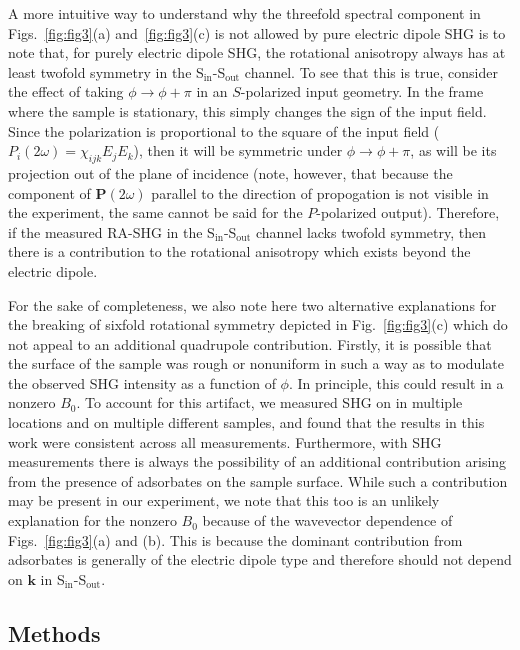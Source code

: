 A more intuitive way to understand why the threefold spectral component in Figs.~\ref{fig:fig3}(a) and~\ref{fig:fig3}(c) is not allowed by pure electric dipole SHG is to note that, for purely electric dipole SHG, the rotational anisotropy always has at least twofold symmetry in the S$_\mathrm{in}$-S$_\mathrm{out}$ channel.
To see that this is true, consider the effect of taking $\phi\rightarrow\phi+\pi$ in an $S$-polarized input geometry.
In the frame where the sample is stationary, this simply changes the sign of the input field. 
Since the polarization is proportional to the square of the input field ($P_i(2\omega) = \chi_{ijk}E_j E_k$), then it will be symmetric under $\phi\rightarrow\phi+\pi$, as will be its projection out of the plane of incidence (note, however, that because the component of $\bm{P}(2\omega)$ parallel to the direction of propogation is not visible in the experiment, the same cannot be said for the $P$-polarized output).
Therefore, if the measured RA-SHG in the S$_\mathrm{in}$-S$_\mathrm{out}$ channel lacks twofold symmetry, then there is a contribution to the rotational anisotropy which exists beyond the electric dipole.

For the sake of completeness, we also note here two alternative explanations for the breaking of sixfold rotational symmetry depicted in Fig.~\ref{fig:fig3}(c) which do not appeal to an additional quadrupole contribution.
Firstly, it is possible that the surface of the sample was rough or nonuniform in such a way as to modulate the observed SHG intensity as a function of $\phi$.
In principle, this could result in a nonzero $B_0$.
To account for this artifact, we measured SHG on \tastwo in multiple locations and on multiple different samples, and found that the results in this work were consistent across all measurements.
Furthermore, with SHG measurements there is always the possibility of an additional contribution arising from the presence of adsorbates on the sample surface\cite{berkovic_interference_1988}.
While such a contribution may be present in our experiment, we note that this too is an unlikely explanation for the nonzero $B_0$ because of the wavevector dependence of Figs.~\ref{fig:fig3}(a) and (b).
This is because the dominant contribution from adsorbates is generally of the electric dipole type and therefore should not depend on $\bm{k}$ in S$_\mathrm{in}$-S$_\mathrm{out}$.

\subsection{Methods}

